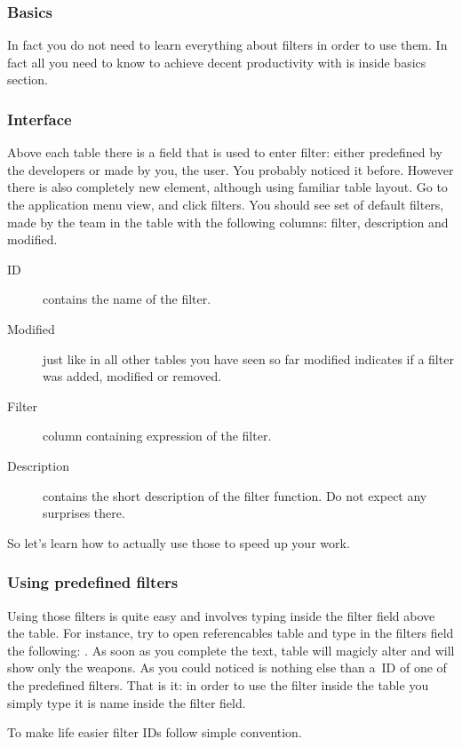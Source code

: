 \subsubsection{Basics}
In fact you do not need to learn everything about filters in order to use them. In fact all you need to know to achieve decent productivity
with \OCS{} is inside basics section.

\subsubsection{Interface}
Above each table there is a field that is used to enter filter: either predefined by the \OMW{} developers or made by you, the user.
You probably noticed it before. However there is also completely new element, although using familiar table layout. Go to the application
menu view, and click filters. You should see set of default filters, made by the \OMW{} team in the table with the following columns: filter,
description and modified.

\begin{description}
 \item[ID] contains the name of the filter.
 \item[Modified] just like in all other tables you have seen so far modified indicates if a filter was added, modified or removed.
 \item[Filter] column containing expression of the filter.
 \item[Description] contains the short description of the filter function. Do not expect any surprises there.
\end{description}

So let's learn how to actually use those to speed up your work.
\subsubsection{Using predefined filters}
Using those filters is quite easy and involves typing inside the filter field above the table. For instance, try to open referencables
table and type in the filters field the following: . As soon as you complete the text, table will magicly alter
and will show only the weapons. As you could noticed  is nothing else than a~ID of one of the predefined filters. That is it:
in order to use the filter inside the table you simply type it is name inside the filter field.

To make life easier filter IDs follow simple convention. 

